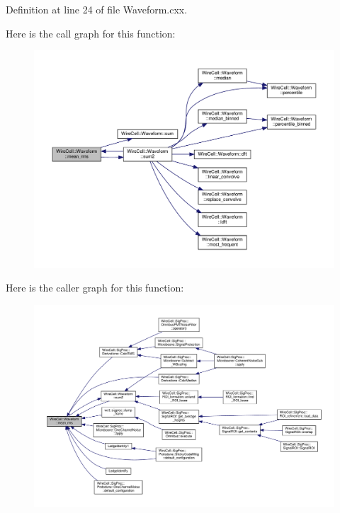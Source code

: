 Definition at line 24 of file Waveform.\+cxx.

Here is the call graph for this function\+:
\nopagebreak
\begin{figure}[H]
\begin{center}
\leavevmode
\includegraphics[width=350pt]{namespace_wire_cell_1_1_waveform_af0395e9b0e5e9e86a26579badb834092_cgraph}
\end{center}
\end{figure}
Here is the caller graph for this function\+:
\nopagebreak
\begin{figure}[H]
\begin{center}
\leavevmode
\includegraphics[width=350pt]{namespace_wire_cell_1_1_waveform_af0395e9b0e5e9e86a26579badb834092_icgraph}
\end{center}
\end{figure}
\mbox{\label{namespace_wire_cell_1_1_waveform_af5e9352cbf35ddaf2f95e924d241a2aa}} 
